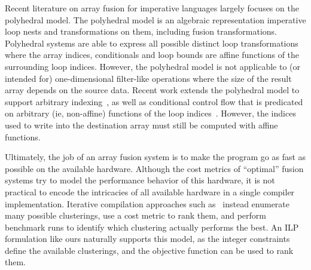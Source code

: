 Recent literature on array fusion for imperative languages largely focuses on the polyhedral model.
The polyhedral model is an algebraic representation imperative loop nests and transformations on them, including fusion transformations.
Polyhedral systems \cite{pouchet2011polyhedral} are able to express all possible distinct loop transformations where the array indices, conditionals and loop bounds are affine functions of the surrounding loop indices.
However, the polyhedral model is not applicable to (or intended for) one-dimensional filter-like operations where the size of the result array depends on the source data.
Recent work extends the polyhedral model to support arbitrary indexing~\cite{venkat2014polyhedral}, as well as conditional control flow that is predicated on arbitrary (ie, non-affine) functions of the loop indices~\cite{benabderrahmane2010polyhedral}.
However, the indices used to write into the destination array must still be computed with affine functions. 

Ultimately, the job of an array fusion system is to make the program go as fast as possible on the available hardware.
Although the cost metrics of ``optimal'' fusion systems try to model the performance behavior of this hardware, it is not practical to encode the intricacies of all available hardware in a single compiler implementation.
Iterative compilation approaches such as~\citet{ashby2006iterative} instead enumerate many possible clusterings, use a cost metric to rank them, and perform benchmark runs to identify which clustering actually performs the best.
An ILP formulation like ours naturally supports this model, as the integer constraints define the available clusterings, and the objective function can be used to rank them.



% 
% 

